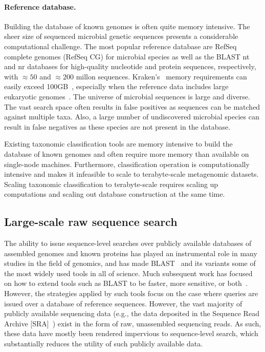 \paragraph{Reference database.}
Building the database of known genomes is often quite memory intensive.
The sheer size of sequenced microbial genetic sequences presents a considerable computational challenge.
The most popular reference database are RefSeq complete genomes (RefSeq CG) for microbial species as well as the BLAST nt and nr databases for high-quality nucleotide and protein sequences, respectively, with $\approx50$ and $\approx200$ millon sequences. 
Kraken's~\cite{wood2014kraken} memory requirements can easily exceed 100GB~\cite{simon2019benchmarking}, especially when the reference data includes large eukaryotic genomes~\cite{meiser2017sequencing, knutson2017porcine}.
%
The universe of microbial sequences is large and diverse. The vast search space often results in false positives as sequences can be matched against multiple taxa. Also, a large number of undiscovered microbial species can result in false negatives as these species are not present in the database.

\begin{rproblem}
Existing taxonomic classification tools are memory intensive to build the database of known genomes and often require more memory than available on single-node machines. Furthermore, classification operation is computationally intensive and makes it infeasible to scale to terabyte-scale metagenomic datasets.
Scaling taxonomic classification to terabyte-scale requires scaling up computations and scaling out database construction at the same time.
\label{rprob:peppermint}
\end{rproblem}



\subsection{Large-scale raw sequence search}

The ability to issue sequence-level searches over publicly available databases of assembled genomes and known proteins has played an instrumental role in many studies in the field of genomics, and has made BLAST~\cite{altschul1990basic} and its variants some of the most widely used tools in all of science. Much subsequent work has focused on how to extend tools such as BLAST to be faster, more sensitive, or both~\cite{XXX}. However, the strategies applied by such tools focus on the case where queries are issued over a database of reference sequences. However, the vast majority of publicly available sequencing data (e.g., the data deposited in the Sequence Read Archive [SRA]~\cite{kodama2012sequence}) exist in the form of raw, unassembled sequencing reads. As such, these data have mostly been rendered impervious to sequence-level search, which substantially reduces the utility of such publicly available data.

